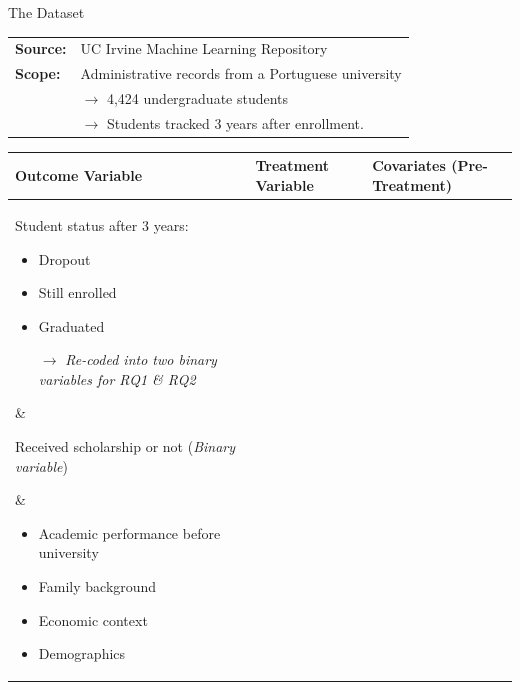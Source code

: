 \documentclass[aspectratio=169]{beamer}
\begin{document}
\begin{frame}{The Dataset}
\vspace{5pt}
\raggedright
\begin{tabular}{ll}
\textbf{Source:} & UC Irvine Machine Learning Repository \\
\textbf{Scope:}  & Administrative records from a Portuguese university \\
                & $\rightarrow$ 4,424 undergraduate students \\
                & $\rightarrow$ Students tracked 3 years after enrollment. \\
\end{tabular}
\begin{center}
\vspace{5pt}
\renewcommand{\arraystretch}{1.2}
\begin{tabularx}{\textwidth}{X | X | X}
\textbf{Outcome Variable} & \textbf{Treatment Variable} & \textbf{Covariates}  (Pre-Treatment)\\[0.5ex]
\hline \hline 
Student status after 3 years: 
\parbox[t]{4cm}{\vspace{-12pt} \begin{itemize}[label=--,leftmargin=1.2em,itemsep=1pt,topsep=2pt]
    \item Dropout
    \item Still enrolled
    \item Graduated
    \item[$\rightarrow$] \textit{Re-coded into two binary variables for RQ1 \& RQ2}
\end{itemize}} &

Received scholarship or not (\textit{Binary variable}) 

& \vspace{-27pt}
\parbox[t]{4cm}{\begin{itemize}[label=--,leftmargin=1.2em,itemsep=1pt,topsep=2pt]
    \item Academic performance before university
    \item Family background
    \item Economic context
    \item Demographics
\end{itemize}}

\end{tabularx}

\end{center}
\end{frame}
\end{document}
